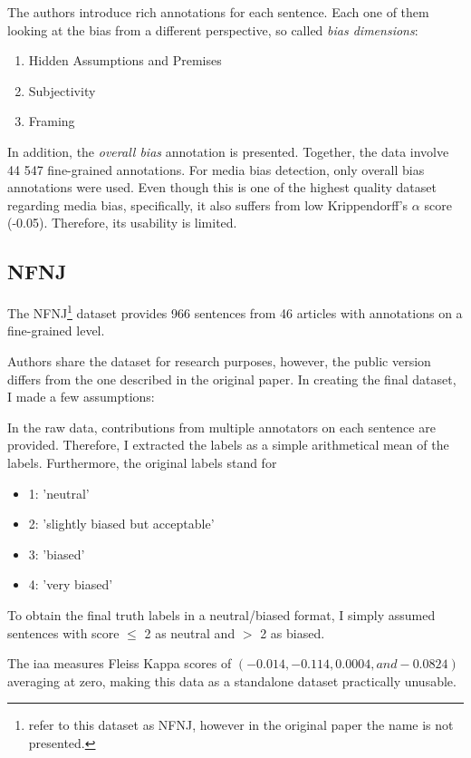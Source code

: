 The authors introduce rich annotations for each sentence. Each one of them looking at the bias from a different perspective, so called \textit{bias dimensions}:
\begin{enumerate}
    \item Hidden Assumptions and Premises
    \item Subjectivity
    \item Framing
\end{enumerate}
In addition, the \textit{overall bias} annotation is presented. Together, the data involve 44 547 fine-grained annotations. For media bias detection, only overall bias annotations were used.
Even though this is one of the highest quality dataset regarding media bias, specifically, it also suffers from low Krippendorff’s $\alpha$ score (-0.05). Therefore, its usability is limited. 




\subsection{NFNJ}
The NFNJ\footnote{\cite{farber2020multidimensional} refer to this dataset as NFNJ, however in the original paper the name is not presented.} dataset provides 966 sentences from 46 articles with annotations on a fine-grained level.

Authors share the dataset for research purposes, however, the public version differs from the one described in the original paper. In creating the final dataset, I made a few assumptions:

In the raw data, contributions from multiple annotators on each sentence are provided. Therefore, I extracted the labels as a simple arithmetical mean of the labels. Furthermore, the original labels stand for 
\begin{itemize}
    \item 1: 'neutral'
    \item 2: 'slightly biased but acceptable'
    \item 3: 'biased'
    \item 4: 'very biased'
\end{itemize}
To obtain the final truth labels in a neutral/biased format, I simply assumed sentences with score $\leq$ 2 as neutral and $>$ 2 as biased.

The \Gls{iaa} measures Fleiss Kappa scores of $(-0.014, -0.114, 0.0004,
and -0.0824)$ averaging at zero, making this data as a standalone dataset practically unusable.



